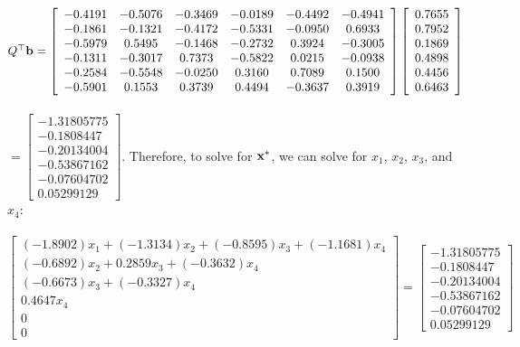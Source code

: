 \documentclass[12pt]{article}
\newcommand{\bfx}{{\bf x}}
\newcommand{\bfb}{{\bf b}}
\begin{document}
\\~\\$Q^{\top}\bfb=\left[\begin{array}{cccccc}{-0.4191} & {-0.5076} & {-0.3469} & {-0.0189} & {-0.4492} & {-0.4941} \\ {-0.1861} & {-0.1321} & {-0.4172} & {-0.5331} & {-0.0950} & {0.6933} \\ {-0.5979} & {0.5495} & {-0.1468} & {-0.2732} & {0.3924} & {-0.3005} \\ {-0.1311} & {-0.3017} & {0.7373} & {-0.5822} & {0.0215} & {-0.0938} \\ {-0.2584} & {-0.5548} & {-0.0250} & {0.3160} & {0.7089} & {0.1500} \\ {-0.5901} & {0.1553} & {0.3739} & {0.4494} & {-0.3637} & {0.3919}\end{array}\right]\left[\begin{array}{l}{0.7655} \\ {0.7952} \\ {0.1869} \\ {0.4898} \\ {0.4456} \\ {0.6463}\end{array}\right]$
\\~\\$=\left[\begin{array}{l}{-1.31805775} \\ {-0.1808447} \\ {-0.20134004} \\ {-0.53867162} \\ {-0.07604702} \\ {0.05299129}\end{array}\right]$. Therefore, to solve for $\bfx^{*}$, we can solve for $x_1$, $x_2$, $x_3$, and $x_4$:
\\~\\$\left[\begin{array}{l}{(-1.8902)x_1+(-1.3134)x_2+(-0.8595)x_3+(-1.1681)x_4} \\ {(-0.6892)x_2+0.2859x_3+(-0.3632)x_4} \\ {(-0.6673)x_3+(-0.3327)x_4} \\ {0.4647x_4} \\ {0} \\ {0}\end{array}\right]=\left[\begin{array}{l}{-1.31805775} \\ {-0.1808447} \\ {-0.20134004} \\ {-0.53867162} \\ {-0.07604702} \\ {0.05299129}\end{array}\right]$
\end{document}
